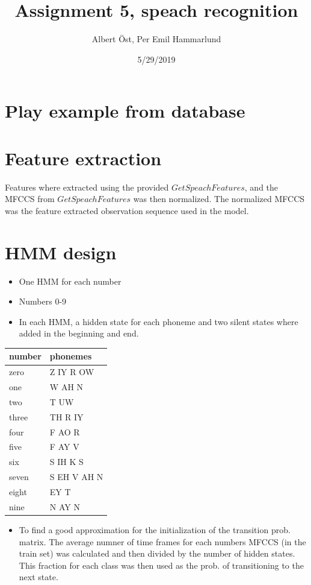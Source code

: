 \documentclass[]{article}
\title{Assignment 5, speach recognition}
\author{Albert Öst, Per Emil Hammarlund}
\date{5/29/2019}
\providecommand{\tightlist}{%
  \setlength{\itemsep}{0pt}\setlength{\parskip}{0pt}}
\begin{document}
\maketitle

\hypertarget{play-example-from-database}{%
\section{Play example from database}\label{play-example-from-database}}

\hypertarget{feature-extraction}{%
\section{Feature extraction}\label{feature-extraction}}

Features where extracted using the provided \(GetSpeachFeatures\), and
the MFCCS from \(GetSpeachFeatures\) was then normalized. The normalized
MFCCS was the feature extracted observation sequence used in the model.

\hypertarget{hmm-design}{%
\section{HMM design}\label{hmm-design}}

\begin{itemize}
\tightlist
\item
  One HMM for each number
\item
  Numbers 0-9
\item
  In each HMM, a hidden state for each phoneme and two silent states
  where added in the beginning and end.
\end{itemize}

\begin{longtable}[]{@{}ll@{}}
\toprule
number & phonemes\tabularnewline
\midrule
\endhead
zero & Z IY R OW\tabularnewline
one & W AH N\tabularnewline
two & T UW\tabularnewline
three & TH R IY\tabularnewline
four & F AO R\tabularnewline
five & F AY V\tabularnewline
six & S IH K S\tabularnewline
seven & S EH V AH N\tabularnewline
eight & EY T\tabularnewline
nine & N AY N\tabularnewline
\bottomrule
\end{longtable}

\begin{itemize}
\tightlist
\item
  To find a good approximation for the initialization of the transition
  prob. matrix. The average numner of time frames for each numbers MFCCS
  (in the train set) was calculated and then divided by the number of
  hidden states. This fraction for each class was then used as the prob.
  of transitioning to the next state.
\end{itemize}
\end{document}
